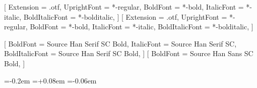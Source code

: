 
\ifdefined\IfFontExistsTF\else
  \newcommand{\IfFontExistsTF}[3]{#3}
\fi


\setmainfont{texgyrepagella}[
  Extension      = .otf,
  UprightFont    = *-regular,
  BoldFont       = *-bold,
  ItalicFont     = *-italic,
  BoldItalicFont = *-bolditalic,
]
\setsansfont{texgyreheros}[
  Extension      = .otf,
  UprightFont    = *-regular,
  BoldFont       = *-bold,
  ItalicFont     = *-italic,
  BoldItalicFont = *-bolditalic,
]
\setmonofont{Menlo}


[
  BoldFont       = Source Han Serif SC Bold,
  ItalicFont     = Source Han Serif SC,
  BoldItalicFont = Source Han Serif SC Bold,
]
[
  BoldFont       = Source Han Sans SC Bold,
]

\newcommand{\heiti}{\CJKfamily{zhhei}}

\newcommand{\kaiti}{\CJKfamily{zhkai}}

\newcommand{\TTTFont}{\fontsize{9.5pt}{\baselineskip}\selectfont\ttfamily}
\DeclareRobustCommand{\ttt}[1]{{\TTTFont #1}}


\usepackage{newunicodechar}

\newdimen\CJKPunctOuterKern   %
\newdimen\CJKPunctInnerKern   %
\newdimen\CJKDashKern         %

\CJKPunctOuterKern=-0.2em
\CJKPunctInnerKern=+0.08em
\CJKDashKern=-0.06em

